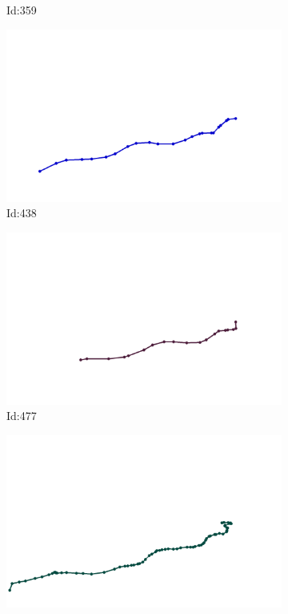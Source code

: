 \documentclass[12pt,twoside]{report}
\begin{document}
\begin{figure}
\begin{subfigure}[b]{0.20\textwidth}
\caption{Id:359}
\end{subfigure}
\begin{subfigure}[b]{0.20\textwidth}
\centering
\includegraphics[width=\textwidth]{../../trajectories/438.png}
\caption{Id:438}
\end{subfigure}
\begin{subfigure}[b]{0.20\textwidth}
\centering
\includegraphics[width=\textwidth]{../../trajectories/477.png}
\caption{Id:477}
\end{subfigure}
\begin{subfigure}[b]{0.20\textwidth}
\centering
\includegraphics[width=\textwidth]{../../trajectories/601.png}

\end{subfigure}
\end{figure}
\end{document}
